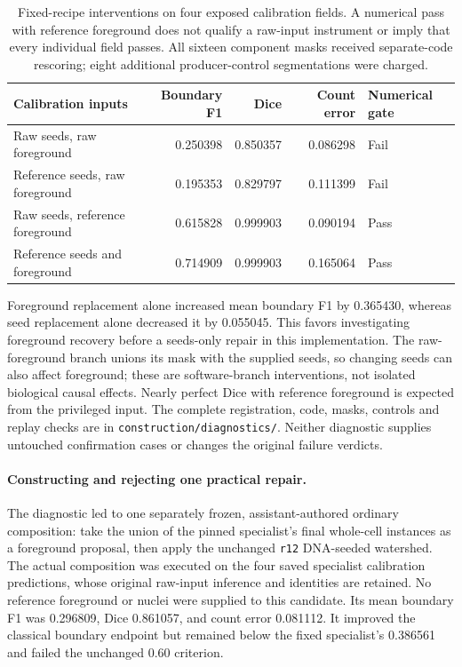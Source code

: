 \begin{table}[htbp]
\centering\small
\begin{tabularx}{\linewidth}{@{}YrrrP{.78in}@{}}
\toprule
\textbf{Calibration inputs} & \textbf{Boundary F1} & \textbf{Dice} & \textbf{Count error} & \textbf{Numerical gate}\\
\midrule
Raw seeds, raw foreground & 0.250398 & 0.850357 & 0.086298 & Fail\\
Reference seeds, raw foreground & 0.195353 & 0.829797 & 0.111399 & Fail\\
Raw seeds, reference foreground & 0.615828 & 0.999903 & 0.090194 & Pass\\
Reference seeds and foreground & 0.714909 & 0.999903 & 0.165064 & Pass\\
\bottomrule
\end{tabularx}
\caption{Fixed-recipe interventions on four exposed calibration fields. A numerical pass with reference foreground does not qualify a raw-input instrument or imply that every individual field passes. All sixteen component masks received separate-code rescoring; eight additional producer-control segmentations were charged.}
\label{tab:component-diagnostic}
\end{table}

Foreground replacement alone increased mean boundary F1 by 0.365430, whereas seed replacement alone decreased it by 0.055045. This favors investigating foreground recovery before a seeds-only repair in this implementation. The raw-foreground branch unions its mask with the supplied seeds, so changing seeds can also affect foreground; these are software-branch interventions, not isolated biological causal effects. Nearly perfect Dice with reference foreground is expected from the privileged input. The complete registration, code, masks, controls and replay checks are in \texttt{construction/diagnostics/}. Neither diagnostic supplies untouched confirmation cases or changes the original failure verdicts.

\paragraph{Constructing and rejecting one practical repair.}
The diagnostic led to one separately frozen, assistant-authored ordinary composition: take the union of the pinned specialist's final whole-cell instances as a foreground proposal, then apply the unchanged \texttt{r12} DNA-seeded watershed. The actual composition was executed on the four saved specialist calibration predictions, whose original raw-input inference and identities are retained. No reference foreground or nuclei were supplied to this candidate. Its mean boundary F1 was 0.296809, Dice 0.861057, and count error 0.081112. It improved the classical boundary endpoint but remained below the fixed specialist's 0.386561 and failed the unchanged 0.60 criterion.

